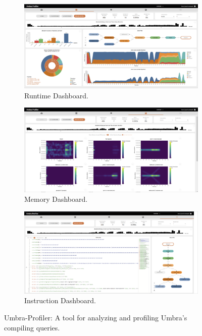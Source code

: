 \begin{figure}[h]
  \vspace{0.5cm}
  \centering
  \begin{subfigure}[b]{0.3\linewidth}
    \includegraphics[width=\linewidth]{figures/umbra-profiler-runtime-dashboard.png}
    \caption{Runtime Dashboard.}
      \label{fig:umbra-profiler-runtime-dashboard}
  \end{subfigure}
  \hspace{0.5cm} %
  \begin{subfigure}[b]{0.3\linewidth}
    \includegraphics[width=\linewidth]{figures/umbra-profiler-memory-dashboard.png}
    \caption{Memory Dashboard.}
      \label{fig:umbra-profiler-memory-dashboard}
  \end{subfigure}
  \hspace{0.5cm} %
  \begin{subfigure}[b]{0.3\linewidth}
    \includegraphics[width=\linewidth]{figures/umbra-profiler-instruction-dashboard.png}
    \caption{Instruction Dashboard.}
      \label{fig:umbra-profiler-instruction-dashboard}
  \end{subfigure}
  \caption{Umbra-Profiler: A tool for analyzing and profiling Umbra’s compiling
  queries.}
  \label{fig:umbra-profiler}
\end{figure}

